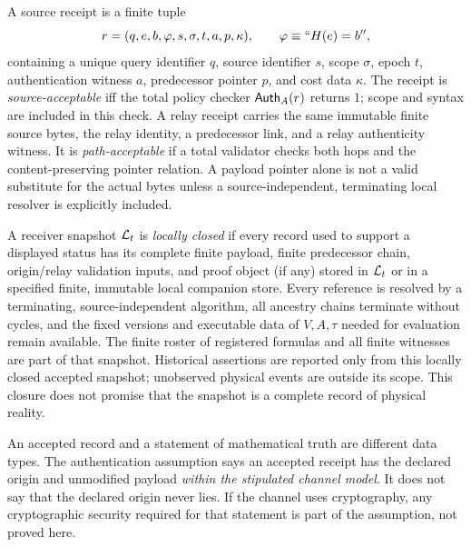 \documentclass[11pt,letterpaper]{article}
\begin{document}
\begin{definition}
A source receipt is a finite tuple
\[
r=(q,e,b,\varphi,s,\sigma,t,a,p,\kappa),\qquad \varphi\equiv ``H(e)=b'',
\]
containing a unique query identifier $q$, source identifier $s$, scope $\sigma$, epoch $t$, authentication witness $a$, predecessor pointer $p$, and cost data $\kappa$. The receipt is \emph{source-acceptable} iff the total policy checker $\mathsf{Auth}_A(r)$ returns $1$; scope and syntax are included in this check. A relay receipt carries the same immutable finite source bytes, the relay identity, a predecessor link, and a relay authenticity witness. It is \emph{path-acceptable} if a total validator checks both hops and the content-preserving pointer relation. A payload pointer alone is not a valid substitute for the actual bytes unless a source-independent, terminating local resolver is explicitly included.
\end{definition}
\begin{definition}
A receiver snapshot $\mathcal L_t$ is \emph{locally closed} if every record used to support a displayed status has its complete finite payload, finite predecessor chain, origin/relay validation inputs, and proof object (if any) stored in $\mathcal L_t$ or in a specified finite, immutable local companion store. Every reference is resolved by a terminating, source-independent algorithm, all ancestry chains terminate without cycles, and the fixed versions and executable data of $V,A,\tau$ needed for evaluation remain available. The finite roster of registered formulas and all finite witnesses are part of that snapshot. Historical assertions are reported only from this locally closed accepted snapshot; unobserved physical events are outside its scope. This closure does not promise that the snapshot is a complete record of physical reality.
\end{definition}

An accepted record and a statement of mathematical truth are different data types. The authentication assumption says an accepted receipt has the declared origin and unmodified payload \emph{within the stipulated channel model}. It does not say that the declared origin never lies. If the channel uses cryptography, any cryptographic security required for that statement is part of the assumption, not proved here.
\end{document}
